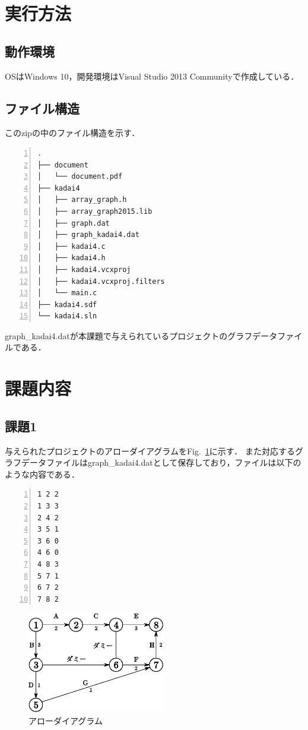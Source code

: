 \documentclass[a4paper,10pt]{jsarticle}
\begin{document}
\section{実行方法}
\subsection{動作環境}
OSはWindows 10，開発環境はVisual Studio 2013 Communityで作成している．

\subsection{ファイル構造}
このzipの中のファイル構造を示す．

\begin{lstlisting}[basicstyle=\ttfamily\footnotesize, language=Bash, frame=single, firstnumber=1, numbers=left, breaklines=true]
.
├── document
│   └── document.pdf
├── kadai4
│   ├── array_graph.h
│   ├── array_graph2015.lib
│   ├── graph.dat
│   ├── graph_kadai4.dat
│   ├── kadai4.c
│   ├── kadai4.h
│   ├── kadai4.vcxproj
│   ├── kadai4.vcxproj.filters
│   └── main.c
├── kadai4.sdf
└── kadai4.sln
\end{lstlisting}

graph\_kadai4.datが本課題で与えられているプロジェクトのグラフデータファイルである．

\section{課題内容}
\subsection{課題1}
与えられたプロジェクトのアローダイアグラムをFig.~\ref{fig:アローダイアグラム}に示す．
また対応するグラフデータファイルはgraph\_kadai4.datとして保存しており，ファイルは以下のような内容である．

\begin{lstlisting}[basicstyle=\ttfamily\footnotesize, language=Bash, frame=single, firstnumber=1, numbers=left, breaklines=true]
1 2 2
1 3 3
2 4 2
3 5 1
3 6 0
4 6 0
4 8 3
5 7 1
6 7 2
7 8 2
\end{lstlisting}

\clearpage

\begin{figure}[t]
  \begin{center}
    \includegraphics[clip,width=6cm]{fig/eps/arrow.eps}
  \end{center}
  \caption{アローダイアグラム}
  \label{fig:アローダイアグラム}
\end{figure}
\end{document}
